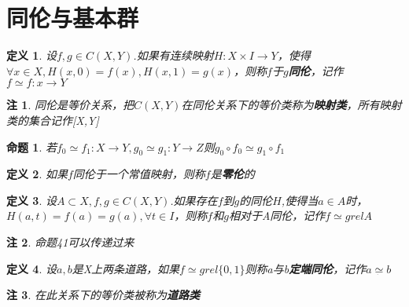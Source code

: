 \documentclass[UTF8]{ctexart}
\newtheorem{dfnt}{定义}
\newtheorem*{note}{注}
\newtheorem{pro}{命题}
\begin{document}
\section{同伦与基本群}
\begin{dfnt}
设$f,g \in C(X,Y)$.如果有连续映射$H:X\times I \rightarrow Y$，使得$\forall x \in X,H(x,0)=f(x),H(x,1)=g(x)$，则称$f$于$g$\textbf{同伦}，记作$f \simeq f:x\rightarrow Y$
\end{dfnt}
\begin{note}
同伦是等价关系，把$C(X,Y)$在同伦关系下的等价类称为\textbf{映射类}，所有映射类的集合记作[X,Y]
\end{note}
\begin{pro}
若$f_0 \simeq f_1:X \rightarrow Y,g_0 \simeq g_1:Y \rightarrow Z$则$g_0\circ f_0 \simeq g_1 \circ f_1$
\end{pro}
\begin{dfnt}
如果$f$同伦于一个常值映射，则称$f$是\textbf{零伦}的
\end{dfnt}
\begin{dfnt}
设$A \subset X,f,g\in C(X,Y)$.如果存在$f$到$g$的同伦$H$,使得当$a \in A$时，$H(a,t)=f(a)=g(a),\forall t \in I$，则称$f$和$g$相对于A同伦，记作$f \simeq g rel A$
\end{dfnt}
\begin{note}
命题41可以传递过来
\end{note}
\begin{dfnt}
设$a,b$是X上两条道路，如果$f \simeq g rel \{0,1\}$则称a与b\textbf{定端同伦}，记作$a\underset{\dot{}}{\simeq} b$
\end{dfnt}
\begin{note}
在此关系下的等价类被称为\textbf{道路类}
\end{note}
\end{document}
